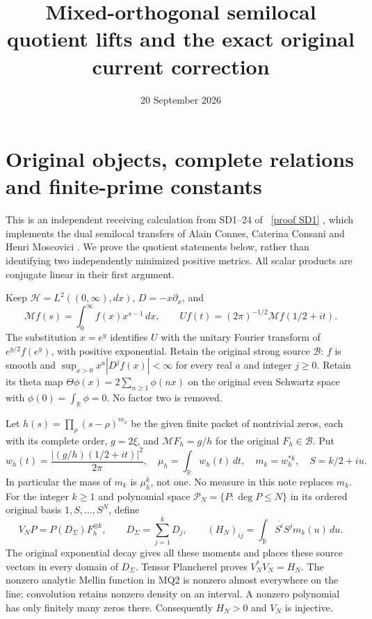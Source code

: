 \documentclass[11pt]{article}
\title{Mixed-orthogonal semilocal quotient lifts and the exact original current correction}
\author{}\date{20 September 2026}
\newcommand{\HH}{\mathcal H}
\newcommand{\M}{\mathcal M}
\newcommand{\B}{\mathscr B}
\begin{document}
\maketitle

\section{Original objects, complete relations and finite-prime constants}
This is an independent receiving calculation from SD1--24 of
\cite{SD}%
~\href{https://github.com/KokunoYumeto/zeta-function-research-reader/blob/5992ad50c0f2a06921f1fcaded7b4e38097c0739/workbenches/splitzero-tandem/continuations/20260920-original-kernel-mixed-determinants/providers/SEMILOCAL_DUAL_THETA_TRANSFER.tex\#L27}{[proof SD1]}%
{}, which implements the dual semilocal transfers of Alain
Connes, Caterina Consani and Henri Moscovici \cite{CCM}. We prove the
quotient statements below, rather than identifying two independently
minimized positive metrics. All scalar products are conjugate linear
in their first argument.

Keep $\HH=L^2((0,\infty),dx)$, $D=-x\partial_x$, and
\[
 \M f(s)=\int_0^\infty f(x)x^{s-1}\,dx,
 \qquad Uf(t)=(2\pi)^{-1/2}\M f(1/2+it).                 \tag{MQ1}
\]
The substitution $x=e^y$ identifies $U$ with the unitary Fourier
transform of $e^{y/2}f(e^y)$, with positive exponential. Retain the
original strong source $\B$: $f$ is smooth and
$\sup_{x>0}x^a|D^jf(x)|<\infty$ for every real $a$ and integer
$j\ge0$. Retain its theta map
$\Theta\phi(x)=2\sum_{n\ge1}\phi(nx)$ on the original even Schwartz
space with $\phi(0)=\int_{\mathbb R}\phi=0$. No factor two is removed.

Let $h(s)=\prod_\rho(s-\rho)^{m_\rho}$ be the given finite packet
of nontrivial zeros, each with its complete order, $g=2\xi$, and
$\M F_h=g/h$ for the original $F_h\in\B$. Put
\[
 w_h(t)=\frac{|(g/h)(1/2+it)|^2}{2\pi},\quad
 \mu_h=\int_{\mathbb R}w_h(t)\,dt,\quad
 m_k=w_h^{*k},\quad S=k/2+iu.                              \tag{MQ2}
\]
In particular the mass of $m_k$ is $\mu_h^k$, not one. No measure
in this note replaces $m_k$. For the integer $k\ge1$ and polynomial
space $\mathcal P_N=\{P:\deg P\le N\}$ in its ordered original
basis $1,S,\ldots,S^N$, define
\[
 V_NP=P(D_\Sigma)F_h^{\otimes k},\qquad
 D_\Sigma=\sum_{j=1}^kD_j,\qquad
 (H_N)_{ij}=\int_{\mathbb R}\overline{S^i}S^j m_k(u)\,du.
                                                               \tag{MQ3}
\]
The original exponential decay gives all these moments and places
these source vectors in every domain of $D_\Sigma$. Tensor
Plancherel proves $V_N^*V_N=H_N$. The nonzero analytic Mellin
function in MQ2 is nonzero almost everywhere on the line;
convolution retains nonzero density on an interval. A nonzero
polynomial has only finitely many zeros there. Consequently
$H_N>0$ and $V_N$ is injective.
\end{document}
